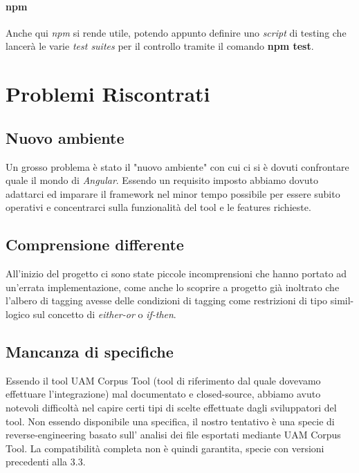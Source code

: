 \documentclass[twoside]{supsistudent}
\begin{document}
\subsubsection{npm}

Anche qui \textit{npm} si rende utile, potendo appunto definire uno
\textit{script} di testing che lancerà le varie \textit{test suites} per il
controllo tramite il comando \textbf{npm test}.

\chapter{Problemi Riscontrati}

\section{Nuovo ambiente}

Un grosso problema è stato il "nuovo ambiente" con cui ci si è dovuti 
confrontare quale il mondo di \textit{Angular}. Essendo un requisito imposto
abbiamo dovuto adattarci ed imparare il framework nel minor tempo possibile
per essere subito operativi e concentrarci sulla funzionalità del tool e le
features richieste.

\section{Comprensione differente}

All'inizio del progetto ci sono state piccole incomprensioni che hanno portato
ad un'errata implementazione, come anche lo scoprire a progetto già inoltrato
che l'albero di tagging avesse delle condizioni di tagging come restrizioni
di tipo simil-logico sul concetto di \textit{either-or} o \textit{if-then}.

\section{Mancanza di specifiche}

Essendo il tool UAM Corpus Tool (tool di riferimento dal quale dovevamo
effettuare l'integrazione) mal documentato e closed-source, abbiamo avuto
notevoli difficoltà nel capire certi tipi di scelte effettuate dagli
sviluppatori del tool. Non essendo disponibile una specifica, 
il nostro tentativo è una specie di reverse-engineering basato sull'
analisi dei file esportati mediante UAM Corpus Tool. La compatibilità
completa non è quindi garantita, specie con versioni precedenti alla 3.3.
\end{document}
